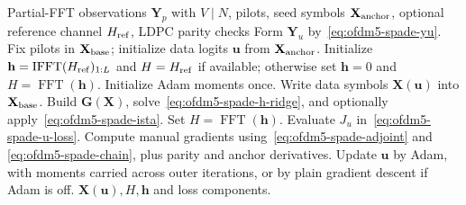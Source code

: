 \documentclass[journal]{IEEEtran}
\begin{document}
\begin{algorithm}[t]
\caption{OFDM5 manual-gradient SPADE-style solver}
\label{alg:ofdm5-spade}
\footnotesize
\begin{algorithmic}[1]
\Require Partial-FFT observations \(\mathbf Y_p\) with \(V\mid N\), pilots, seed
  symbols \(\mathbf X_{\rm anchor}\), optional reference channel \(H_{\rm ref}\),
  LDPC parity checks
\State Form \(\mathbf Y_u\) by~\eqref{eq:ofdm5-spade-yu}.
\State Fix pilots in \(\mathbf X_{\rm base}\); initialize data logits
  \(\mathbf u\) from \(\mathbf X_{\rm anchor}\).
\State Initialize \(\mathbf h=\operatorname{IFFT}(H_{\rm ref})_{1:L}\) and
  \(H=H_{\rm ref}\) if available; otherwise set \(\mathbf h=0\) and
  \(H=\operatorname{FFT}(\mathbf h)\).
\State Initialize Adam moments once.
  \State Write data symbols \(\mathbf X(\mathbf u)\) into \(\mathbf X_{\rm base}\).
  \State Build \(\mathbf G(\mathbf X)\), solve~\eqref{eq:ofdm5-spade-h-ridge},
    and optionally apply~\eqref{eq:ofdm5-spade-ista}.
  \State Set \(H=\operatorname{FFT}(\mathbf h)\).
    \State Evaluate \(J_u\) in~\eqref{eq:ofdm5-spade-u-loss}.
    \State Compute manual gradients using~\eqref{eq:ofdm5-spade-adjoint} and
      \eqref{eq:ofdm5-spade-chain}, plus parity and anchor derivatives.
    \State Update \(\mathbf u\) by Adam, with moments carried across outer
      iterations, or by plain gradient descent if Adam is off.
  \EndFor
\EndFor
\State \Return \(\mathbf X(\mathbf u),H,\mathbf h\) and loss components.
\end{algorithmic}
\end{algorithm}
\end{document}

